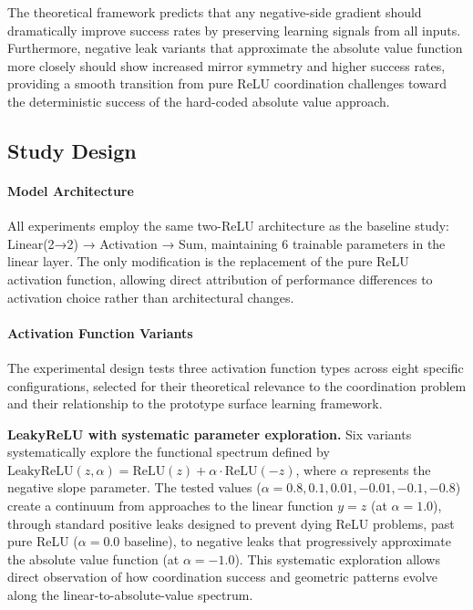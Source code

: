 The theoretical framework predicts that any negative-side gradient should dramatically improve success rates by preserving learning signals from all inputs. Furthermore, negative leak variants that approximate the absolute value function more closely should show increased mirror symmetry and higher success rates, providing a smooth transition from pure ReLU coordination challenges toward the deterministic success of the hard-coded absolute value approach.


\subsection*{Study Design}

\paragraph{Model Architecture}
All experiments employ the same two-ReLU architecture as the baseline study: Linear(2→2) → Activation → Sum, maintaining 6 trainable parameters in the linear layer. The only modification is the replacement of the pure ReLU activation function, allowing direct attribution of performance differences to activation choice rather than architectural changes.

\paragraph{Activation Function Variants}
The experimental design tests three activation function types across eight specific configurations, selected for their theoretical relevance to the coordination problem and their relationship to the prototype surface learning framework.

\textbf{LeakyReLU with systematic parameter exploration.} Six variants systematically explore the functional spectrum defined by $\text{LeakyReLU}(z, \alpha) = \text{ReLU}(z) + \alpha \cdot \text{ReLU}(-z)$, where $\alpha$ represents the negative slope parameter. The tested values ($\alpha = 0.8, 0.1, 0.01, -0.01, -0.1, -0.8$) create a continuum from approaches to the linear function $y = z$ (at $\alpha = 1.0$), through standard positive leaks designed to prevent dying ReLU problems, past pure ReLU ($\alpha = 0.0$ baseline), to negative leaks that progressively approximate the absolute value function (at $\alpha = -1.0$). This systematic exploration allows direct observation of how coordination success and geometric patterns evolve along the linear-to-absolute-value spectrum.

